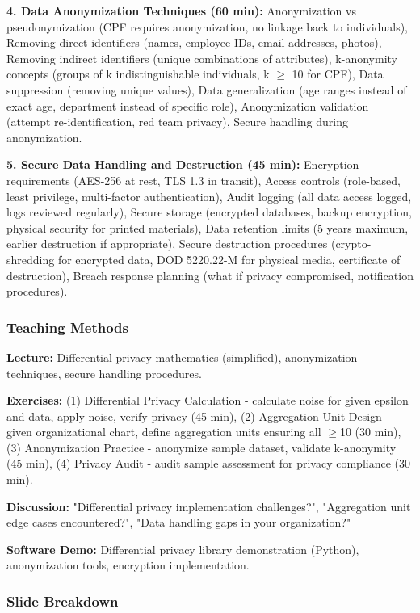 \documentclass[11pt,a4paper]{article}
\begin{document}
\textbf{4. Data Anonymization Techniques (60 min):} Anonymization vs pseudonymization (CPF requires anonymization, no linkage back to individuals), Removing direct identifiers (names, employee IDs, email addresses, photos), Removing indirect identifiers (unique combinations of attributes), k-anonymity concepts (groups of k indistinguishable individuals, k $\ge$ 10 for CPF), Data suppression (removing unique values), Data generalization (age ranges instead of exact age, department instead of specific role), Anonymization validation (attempt re-identification, red team privacy), Secure handling during anonymization.

\textbf{5. Secure Data Handling and Destruction (45 min):} Encryption requirements (AES-256 at rest, TLS 1.3 in transit), Access controls (role-based, least privilege, multi-factor authentication), Audit logging (all data access logged, logs reviewed regularly), Secure storage (encrypted databases, backup encryption, physical security for printed materials), Data retention limits (5 years maximum, earlier destruction if appropriate), Secure destruction procedures (crypto-shredding for encrypted data, DOD 5220.22-M for physical media, certificate of destruction), Breach response planning (what if privacy compromised, notification procedures).

\subsubsection{Teaching Methods}

\textbf{Lecture:} Differential privacy mathematics (simplified), anonymization techniques, secure handling procedures.

\textbf{Exercises:} (1) Differential Privacy Calculation - calculate noise for given epsilon and data, apply noise, verify privacy (45 min), (2) Aggregation Unit Design - given organizational chart, define aggregation units ensuring all $\ge$10 (30 min), (3) Anonymization Practice - anonymize sample dataset, validate k-anonymity (45 min), (4) Privacy Audit - audit sample assessment for privacy compliance (30 min).

\textbf{Discussion:} "Differential privacy implementation challenges?", "Aggregation unit edge cases encountered?", "Data handling gaps in your organization?"

\textbf{Software Demo:} Differential privacy library demonstration (Python), anonymization tools, encryption implementation.

\subsubsection{Slide Breakdown}
\end{document}
